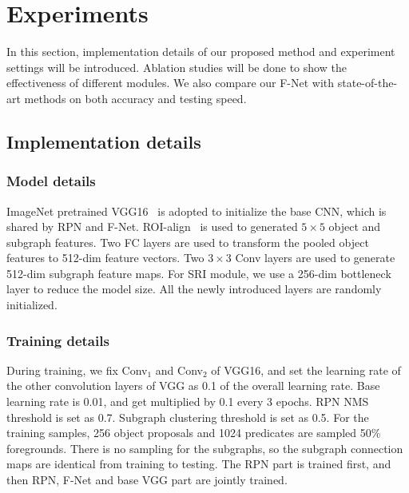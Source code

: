 \documentclass[runningheads]{llncs}
\begin{document}
\section{Experiments}
In this section, implementation details of our proposed method and experiment settings will be introduced. Ablation studies will be done to show the effectiveness of different modules. We also compare our F-Net with state-of-the-art methods on both accuracy and testing speed. 

\subsection{Implementation details}
\subsubsection{Model details} ImageNet pretrained VGG16~\cite{VGG} is adopted to initialize the base CNN, which is shared by RPN and F-Net. ROI-align~\cite{he2017mask} is used to generated $5 \times 5$ object and subgraph features. Two FC layers are used to transform the pooled object features to 512-dim feature vectors. Two $3\times 3$ Conv layers are used to generate 512-dim subgraph feature maps. For SRI module, we use a 256-dim bottleneck layer to reduce the model size. All the newly introduced layers are randomly initialized. 

\subsubsection{Training details} 
During training, we fix Conv$_1$ and Conv$_2$ of VGG16, and set the learning rate of the other convolution layers of VGG as 0.1 of the overall learning rate. Base learning rate is 0.01,  and get multiplied by 0.1 every 3 epochs. RPN NMS threshold is set as 0.7. Subgraph clustering threshold is set as 0.5. For the training samples, 256 object proposals and 1024 predicates are sampled 50\% foregrounds. There is no sampling for the subgraphs, so the subgraph connection maps are identical from training to testing. The RPN part is trained first, and then RPN, F-Net and base VGG part are jointly trained. 
\end{document}
